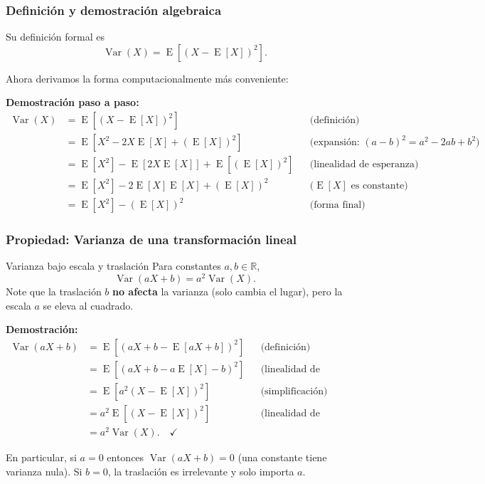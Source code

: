 \documentclass[11pt,a4paper]{article}
\DeclareMathOperator{\E}{E}
\DeclareMathOperator{\Var}{Var}
\begin{document}
\subsubsection*{Definición y demostración algebraica}

Su definición formal es
\[
\boxed{\Var(X)=\E\left[(X-\E[X])^2\right]}.
\]

Ahora derivamos la forma computacionalmente más conveniente:

\noindent\textbf{Demostración paso a paso:}
\begin{align}
\Var(X) &= \E\left[(X-\E[X])^2\right] && \text{(definición)}\\
&= \E\left[X^2-2X\E[X]+(\E[X])^2\right] && \text{(expansión: } (a-b)^2=a^2-2ab+b^2\text{)}\\
&= \E[X^2]-\E[2X\E[X]]+\E[(\E[X])^2] && \text{(linealidad de esperanza)}\\
&= \E[X^2]-2\E[X]\E[X]+(\E[X])^2 && \text{(\(\E[X]\) es constante)}\\
&\boxed{= \E[X^2]-(\E[X])^2} && \text{(forma final)}
\end{align}

\subsubsection*{Propiedad: Varianza de una transformación lineal}

\begin{propiedad}{Varianza bajo escala y traslación}
Para constantes \(a,b\in\mathbb{R}\),
\[
\boxed{\Var(aX+b)=a^2\Var(X)}.
\]
Note que la traslación \(b\) \textbf{no afecta} la varianza (solo cambia el lugar), pero la escala \(a\) se eleva al cuadrado.
\end{propiedad}

\noindent\textbf{Demostración:}
\begin{align}
\Var(aX+b) &= \E\left[(aX+b-\E[aX+b])^2\right] && \text{(definición)}\\
&= \E\left[(aX+b-a\E[X]-b)^2\right] && \text{(linealidad de esperanza)}\\
&= \E\left[a^2(X-\E[X])^2\right] && \text{(simplificación)}\\
&= a^2\E\left[(X-\E[X])^2\right] && \text{(linealidad de esperanza)}\\
&= a^2\Var(X). \quad\checkmark
\end{align}

\begin{observacion}
En particular, si \(a=0\) entonces \(\Var(aX+b)=0\) (una constante tiene varianza nula). Si \(b=0\), la traslación es irrelevante y solo importa \(a\).
\end{observacion}
\end{document}

